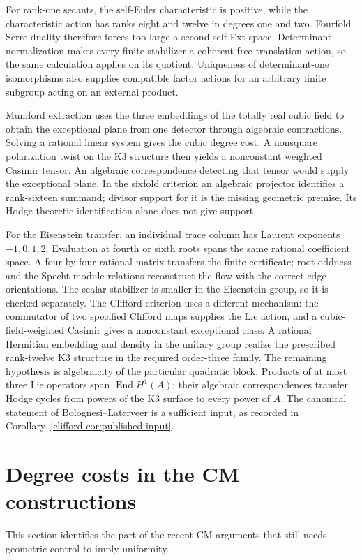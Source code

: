 \documentclass[11pt]{article}
\theoremstyle{definition}
\theoremstyle{remark}
\begin{document}
For rank-one secants, the self-Euler characteristic is positive,
while the characteristic action has ranks eight and twelve in
degrees one and two. Fourfold Serre duality therefore forces too
large a second self-Ext space. Determinant normalization makes every
finite stabilizer a coherent free translation action, so the same
calculation applies on its quotient. Uniqueness of determinant-one
isomorphisms also supplies compatible factor actions for an arbitrary
finite subgroup acting on an external product.

Mumford extraction uses the three embeddings of the totally real
cubic field to obtain the exceptional plane from one detector through
algebraic contractions. Solving a rational linear system gives the
cubic degree cost. A nonsquare polarization twist on the K3 structure
then yields a nonconstant weighted Casimir tensor. An algebraic
correspondence detecting that tensor would supply the exceptional
plane. In the sixfold criterion an algebraic projector identifies a
rank-sixteen summand; divisor support for it is the missing geometric
premise. Its Hodge-theoretic identification alone does not give support.

For the Eisenstein transfer, an individual trace column has Laurent
exponents $-1,0,1,2$. Evaluation at fourth or sixth roots spans the
same rational coefficient space. A four-by-four rational matrix
transfers the finite certificate; root oddness and the Specht-module
relations reconstruct the flow with the correct edge orientations.
The scalar stabilizer is smaller in the Eisenstein group, so it is
checked separately. The Clifford criterion uses a different mechanism:
the commutator of two specified Clifford maps supplies the Lie action,
and a cubic-field-weighted Casimir gives a nonconstant exceptional
class. A rational Hermitian embedding and density in the unitary group
realize the prescribed rank-twelve K3 structure in the required
order-three family. The remaining hypothesis is algebraicity of the
particular quadratic block. Products of at most three Lie operators span
$\operatorname{End}H^1(A)$; their algebraic correspondences transfer
Hodge cycles from powers of the K3 surface to every power of $A$.
The canonical statement of Bolognesi--Laterveer is a sufficient input,
as recorded in Corollary~\ref{clifford-cor:published-input}.

\section{Degree costs in the CM constructions}
\label{sec:cm-cost}
This section identifies the part of the recent CM arguments that still needs geometric control to imply uniformity.
\end{document}
